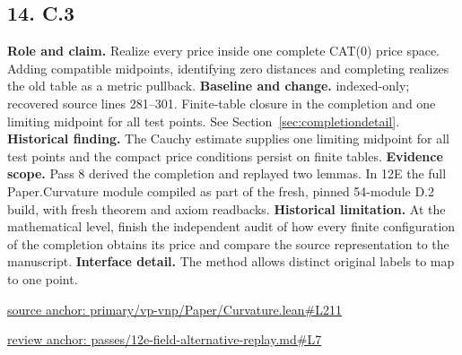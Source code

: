 \documentclass[11pt,letterpaper]{article}
\theoremstyle{definition}\newtheorem{definition}[theorem]{Definition}\newtheorem{example}[theorem]{Example}
\theoremstyle{remark}\newtheorem{remark}[theorem]{Remark}
\begin{document}
\subsection*{14. C.3}
\textbf{Role and claim.} Realize every price inside one complete CAT(0) price space. Adding compatible midpoints, identifying zero distances and completing realizes the old table as a metric pullback.
\textbf{Baseline and change.} indexed-only; recovered source lines 281--301. Finite-table closure in the completion and one limiting midpoint for all test points. See Section~\ref{sec:completiondetail}.
\textbf{Historical finding.} The Cauchy estimate supplies one limiting midpoint for all test points and the compact price conditions persist on finite tables.
\textbf{Evidence scope.} Pass 8 derived the completion and replayed two lemmas. In 12E the full Paper.Curvature module compiled as part of the fresh, pinned 54-module D.2 build, with fresh theorem and axiom readbacks.
\textbf{Historical limitation.} At the mathematical level, finish the independent audit of how every finite configuration of the completion obtains its price and compare the source representation to the manuscript.
\textbf{Interface detail.} The method allows distinct original labels to map to one point.
\par\href{https://github.com/nousentllc/VP-VNP-Review/blob/8a7976933b6b2b4ffda1ad3a0dfb5fc6b6f023e8/primary/vp-vnp/Paper/Curvature.lean\#L211}{source anchor: primary/vp-vnp/Paper/Curvature.lean\#L211}
\par\href{https://github.com/nousentllc/VP-VNP-Review/blob/8a7976933b6b2b4ffda1ad3a0dfb5fc6b6f023e8/passes/12e-field-alternative-replay.md\#L7}{review anchor: passes/12e-field-alternative-replay.md\#L7}
\goodbreak
\end{document}
